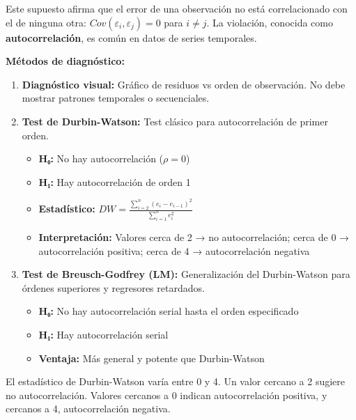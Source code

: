 \documentclass[
  letterpaper,
  DIV=11,
  numbers=noendperiod]{scrreprt}
\providecommand{\tightlist}{%
  \setlength{\itemsep}{0pt}\setlength{\parskip}{0pt}}
\begin{document}
Este supuesto afirma que el error de una observación no está
correlacionado con el de ninguna otra:
\(Cov(\varepsilon_i, \varepsilon_j) = 0\) para \(i \neq j\). La
violación, conocida como \textbf{autocorrelación}, es común en datos de
series temporales.

\textbf{Métodos de diagnóstico:}

\begin{enumerate}
\def\labelenumi{\arabic{enumi}.}
\item
  \textbf{Diagnóstico visual:} Gráfico de residuos vs orden de
  observación. No debe mostrar patrones temporales o secuenciales.
\item
  \textbf{Test de Durbin-Watson:} Test clásico para autocorrelación de
  primer orden.

  \begin{itemize}
  \tightlist
  \item
    \textbf{H₀:} No hay autocorrelación (\(\rho = 0\))
  \item
    \textbf{H₁:} Hay autocorrelación de orden 1
  \item
    \textbf{Estadístico:}
    \(DW = \frac{\sum_{i=2}^{n}(e_i - e_{i-1})^2}{\sum_{i=1}^{n}e_i^2}\)
  \item
    \textbf{Interpretación:} Valores cerca de 2 → no autocorrelación;
    cerca de 0 → autocorrelación positiva; cerca de 4 → autocorrelación
    negativa
  \end{itemize}
\item
  \textbf{Test de Breusch-Godfrey (LM):} Generalización del
  Durbin-Watson para órdenes superiores y regresores retardados.

  \begin{itemize}
  \tightlist
  \item
    \textbf{H₀:} No hay autocorrelación serial hasta el orden
    especificado
  \item
    \textbf{H₁:} Hay autocorrelación serial
  \item
    \textbf{Ventaja:} Más general y potente que Durbin-Watson
  \end{itemize}
\end{enumerate}

El estadístico de Durbin-Watson varía entre 0 y 4. Un valor cercano a 2
sugiere no autocorrelación. Valores cercanos a 0 indican autocorrelación
positiva, y cercanos a 4, autocorrelación negativa.
\end{document}
